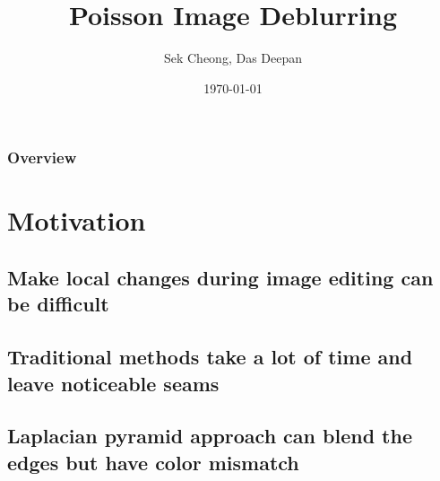 \documentclass{beamer}
\title[]{Poisson Image Deblurring} %
\author{Sek Cheong, Das Deepan} %
\institute[UW] %
{
University of Wisconsin, Madison \\ %
\medskip
\textit{\{sucheong, ddas27\}@wisc.com} %
}
\date{\today} %
\begin{document}
\begin{frame}
\titlepage %
\end{frame}

\begin{frame}
\frametitle{Overview} 
\tableofcontents 
\end{frame}



\section{Motivation} 

\subsection{Make local changes during image editing can be difficult}
\subsection{Traditional methods take a lot of time and leave noticeable seams}
\subsection{Laplacian pyramid approach can blend the edges but have color mismatch}
\end{document}
